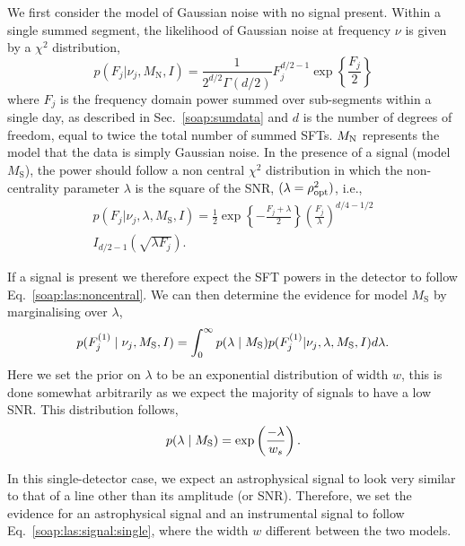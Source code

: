 We first consider the model of Gaussian noise with no signal present. Within
a single summed segment, the likelihood of Gaussian noise at
frequency $\nu$ is given by a $\chi^2$ distribution,
%
\begin{equation}
\label{soap:las:central}
p(F_j|\nu_j,M_{\text{N}},I) = \frac{1}{2^{d/2}\Gamma(d/2)}F_j^{d/2 - 1}\exp{\left\{
\frac{F_j}{2}\right\}}
\end{equation}
%
where $F_j$ is the frequency domain power summed over sub-segments within a single day, as described in Sec.~\ref{soap:sumdata} and  $d$ is the number of degrees of freedom,  equal to twice the total number of summed SFTs.  $M_{\rm{N}}$ represents the model that the data is simply Gaussian noise. In the presence of a signal (model $M_{\text{S}}$), the power should follow a non central $ \chi^2 $ distribution in which the non-centrality parameter $\lambda$ is the square of the \gls{SNR}, $(\lambda = \rho_{\rm{opt}}^2 )$, i.e.,
%
\begin{equation}
\label{soap:las:noncentral}
\begin{split}
p(F_j|\nu_j,\lambda,M_{\text{S}},I) = \frac{1}{2} \exp{\left\{ -\frac{F_j+\lambda}{2}\right\}} \left( \frac{F_j}{\lambda} \right)^{d/4 - 1/2} \\
I_{d/2 -1}\left( \sqrt{\lambda F_j}\right).
\end{split}
\end{equation}
%

If a signal is present we therefore expect the \gls{SFT} powers in the detector to follow Eq.~\ref{soap:las:noncentral}.  We can then determine the evidence for model $M_{\text{S}}$ by marginalising over $\lambda$,
%
\begin{equation}
\label{soap:las:signal:single}
\begin{split}
p(F^{(1)}_{j} \mid \nu_j, M_{\rm{S}},I) = \int_0^{\infty}  p(\lambda \mid M_{\rm{S}}) 
p(F^{(1)}_{j}|\nu_j,\lambda,M_{\text{S}},I) d\lambda.
\end{split}
\end{equation}
%
Here we set the prior on $\lambda$ to be an exponential distribution of width $w$, this is done somewhat arbitrarily as we expect the majority of signals to have a low \gls{SNR}. This distribution follows,
\begin{equation}
\label{soap:las:prior}
p(\lambda \mid M_{\rm{S}}) = \exp\left( \frac{-\lambda}{w_s}\right).
\end{equation}

In this single-detector case, we expect an astrophysical signal to look very similar to that of a line other than its amplitude (or SNR). Therefore, we set the evidence for an astrophysical signal and an instrumental signal to follow Eq.~\ref{soap:las:signal:single}, where the width $w$ different between the two models.

